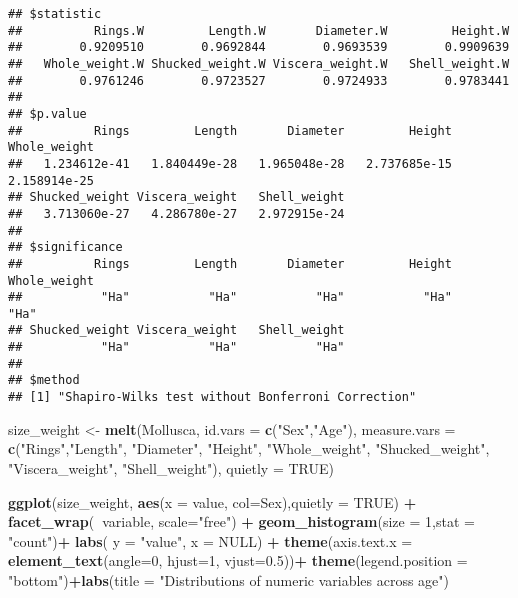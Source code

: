 \documentclass[]{article}
\newenvironment{Shaded}{\begin{snugshade}}{\end{snugshade}}
\newcommand{\DataTypeTok}[1]{\textcolor[rgb]{0.13,0.29,0.53}{#1}}
\newcommand{\DecValTok}[1]{\textcolor[rgb]{0.00,0.00,0.81}{#1}}
\newcommand{\FloatTok}[1]{\textcolor[rgb]{0.00,0.00,0.81}{#1}}
\newcommand{\KeywordTok}[1]{\textcolor[rgb]{0.13,0.29,0.53}{\textbf{#1}}}
\newcommand{\NormalTok}[1]{#1}
\newcommand{\OperatorTok}[1]{\textcolor[rgb]{0.81,0.36,0.00}{\textbf{#1}}}
\newcommand{\OtherTok}[1]{\textcolor[rgb]{0.56,0.35,0.01}{#1}}
\newcommand{\StringTok}[1]{\textcolor[rgb]{0.31,0.60,0.02}{#1}}
\begin{document}
\begin{verbatim}
## $statistic
##          Rings.W         Length.W       Diameter.W         Height.W 
##        0.9209510        0.9692844        0.9693539        0.9909639 
##   Whole_weight.W Shucked_weight.W Viscera_weight.W   Shell_weight.W 
##        0.9761246        0.9723527        0.9724933        0.9783441 
## 
## $p.value
##          Rings         Length       Diameter         Height   Whole_weight 
##   1.234612e-41   1.840449e-28   1.965048e-28   2.737685e-15   2.158914e-25 
## Shucked_weight Viscera_weight   Shell_weight 
##   3.713060e-27   4.286780e-27   2.972915e-24 
## 
## $significance
##          Rings         Length       Diameter         Height   Whole_weight 
##           "Ha"           "Ha"           "Ha"           "Ha"           "Ha" 
## Shucked_weight Viscera_weight   Shell_weight 
##           "Ha"           "Ha"           "Ha" 
## 
## $method
## [1] "Shapiro-Wilks test without Bonferroni Correction"
\end{verbatim}

\begin{Shaded}
\begin{Highlighting}[]
\NormalTok{size_weight <-}\StringTok{ }\KeywordTok{melt}\NormalTok{(Mollusca, }\DataTypeTok{id.vars =} \KeywordTok{c}\NormalTok{(}\StringTok{"Sex"}\NormalTok{,}\StringTok{"Age"}\NormalTok{), }\DataTypeTok{measure.vars =} \KeywordTok{c}\NormalTok{(}\StringTok{"Rings"}\NormalTok{,}\StringTok{"Length"}\NormalTok{, }\StringTok{"Diameter"}\NormalTok{, }\StringTok{"Height"}\NormalTok{, }\StringTok{"Whole_weight"}\NormalTok{, }\StringTok{"Shucked_weight"}\NormalTok{, }\StringTok{"Viscera_weight"}\NormalTok{, }\StringTok{"Shell_weight"}\NormalTok{), }\DataTypeTok{quietly =} \OtherTok{TRUE}\NormalTok{)}

\KeywordTok{ggplot}\NormalTok{(size_weight, }\KeywordTok{aes}\NormalTok{(}\DataTypeTok{x =}\NormalTok{ value, }\DataTypeTok{col=}\NormalTok{Sex),}\DataTypeTok{quietly =} \OtherTok{TRUE}\NormalTok{) }\OperatorTok{+}\StringTok{ }\KeywordTok{facet_wrap}\NormalTok{(}\OperatorTok{~}\NormalTok{variable, }\DataTypeTok{scale=}\StringTok{"free"}\NormalTok{) }\OperatorTok{+}\StringTok{ }\KeywordTok{geom_histogram}\NormalTok{(}\DataTypeTok{size =} \DecValTok{1}\NormalTok{,}\DataTypeTok{stat =} \StringTok{"count"}\NormalTok{)}\OperatorTok{+}\StringTok{ }\KeywordTok{labs}\NormalTok{( }\DataTypeTok{y =} \StringTok{"value"}\NormalTok{, }\DataTypeTok{x =} \OtherTok{NULL}\NormalTok{) }\OperatorTok{+}\StringTok{ }\KeywordTok{theme}\NormalTok{(}\DataTypeTok{axis.text.x =} \KeywordTok{element_text}\NormalTok{(}\DataTypeTok{angle=}\DecValTok{0}\NormalTok{, }\DataTypeTok{hjust=}\DecValTok{1}\NormalTok{, }\DataTypeTok{vjust=}\FloatTok{0.5}\NormalTok{))}\OperatorTok{+}\StringTok{ }\KeywordTok{theme}\NormalTok{(}\DataTypeTok{legend.position =} \StringTok{"bottom"}\NormalTok{)}\OperatorTok{+}\KeywordTok{labs}\NormalTok{(}\DataTypeTok{title =} \StringTok{"Distributions of numeric variables across age"}\NormalTok{)}
\end{Highlighting}
\end{Shaded}
\end{document}
